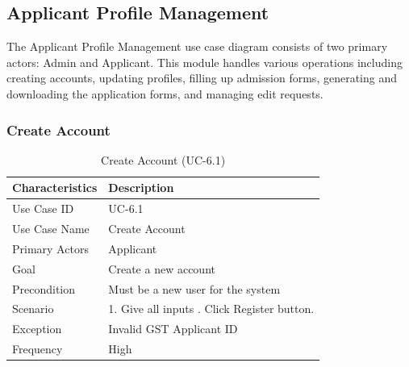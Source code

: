 \subsection{Applicant Profile Management}

The Applicant Profile Management use case diagram consists of two primary actors: Admin and Applicant. This module handles various operations including creating accounts, updating profiles, filling up admission forms, generating and downloading the application forms, and managing edit requests.



\subsubsection{Create Account}
\begin{table}[!htbp]
    \centering
    \small
    \renewcommand{\arraystretch}{1.4}
    \caption{Create Account (UC-6.1)}
    \label{tab:create_account_applicant}
    \begin{tabularx}{\textwidth}{|l|X|}
        \hline
        \rowcolor[gray]{0.9} {Characteristics} & {Description} \\ \hline
        Use Case ID & UC-6.1 \\ \hline
        Use Case Name & Create Account \\ \hline
        Primary Actors & Applicant \\ \hline
        Goal & Create a new account \\ \hline
        Precondition & Must be a new user for the system \\ \hline
        Scenario & 1. Give all inputs \newline 2. Click Register button. \\ \hline
        Exception & Invalid GST Applicant ID \\ \hline
        Frequency & High \\ \hline
    \end{tabularx}
\end{table}


